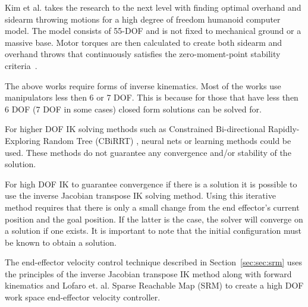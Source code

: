 Kim et al. \cite{5686315,JooH2011438} takes the research to the next level with finding optimal overhand and sidearm throwing motions for a high degree of freedom humanoid computer model.  The model consists of 55-DOF and is not fixed to mechanical ground or a massive base.  Motor torques are then calculated to create both sidearm and overhand throws that continuously satisfies the zero-moment-point stability criteria~\cite{4309277}.  

The above works require forms of inverse kinematics.
Most of the works use manipulators less then 6 or 7 DOF.
This is because for those that have less then 6 DOF (7 DOF in some cases) closed form solutions can be solved for\cite{ik5163900,5649842,ik97878,ik326569,ik1087114}.

For higher DOF IK solving methods such as Constrained Bi-directional Rapidly-Exploring Random Tree (CBiRRT) \cite{Berenson_2009_6309}, neural nets\cite{ik23979,ik845162,ik131985,ik832704,ik1662342,ik932681} or learning methods\cite{ik4543497} could be used.
These methods do not guarantee any convergence and/or stability of the solution.

For high DOF IK to guarantee convergence if there is a solution it is possible to use the inverse Jacobian transpose IK solving method\cite{ik99999,ik844073,ik973374,ik4655620}.
Using this iterative method requires that there is only a small change from the end effector's current position and the goal position.  
If the latter is the case, the solver will converge on a solution if one exists.
It is important to note that the initial configuration must be known to obtain a solution.

The end-effector velocity control technique described in Section~\ref{sec:sec:srm} uses the principles of the inverse Jacobian transpose IK method along with forward kinematics and Lofaro et. al.\cite{6385987} Sparse Reachable Map (SRM) to create a high DOF work space end-effector velocity controller.






